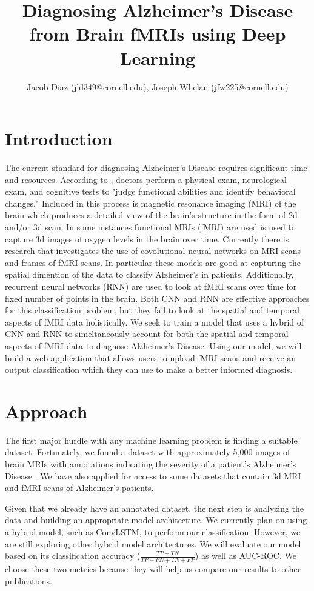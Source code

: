 \documentclass[10pt]{article}
\title{Diagnosing Alzheimer's Disease from Brain fMRIs using Deep Learning}
\author{Jacob Diaz (jld349@cornell.edu), Joseph Whelan (jfw225@cornell.edu)}
\begin{document}
 
	
	\maketitle
	
	\section{Introduction}
	The current standard for diagnosing Alzheimer's Disease requires significant time and resources. According to \cite[Mayo Clinic]{alz_desc}, doctors perform a physical exam, neurological exam, and cognitive tests to 
	"judge functional abilities and identify behavioral changes." Included in this process is magnetic resonance imaging (MRI) of the brain which produces a detailed view of the brain's structure in the form of 2d and/or 3d scan. In some instances functional MRIs (fMRI) are used is used to capture 3d images of oxygen levels in the brain over time. Currently there is research that investigates the use of covolutional neural networks on MRI scans and frames of fMRI scans. In particular these models are good at capturing the spatial dimention of the data to classify Alzheimer's in patients. Additionally, recurrent neural networks (RNN) are used to look at fMRI scans over time for fixed number of points in the brain. Both CNN and RNN are effective approaches for this classification problem, but they fail to look at the spatial and temporal aspects of fMRI data holistically. We seek to train a model that uses a hybrid of CNN and RNN to simeltaneously account for both the spatial and temporal aspects of fMRI data to diagnose Alzheimer's Disease. Using our model, we will build a web application that allows users to upload fMRI scans and receive an output classification which they can use to make a better informed diagnosis.
	

	\section{Approach}
	The first major hurdle with any machine learning problem is finding a suitable dataset. Fortunately, we found a dataset with approximately 5,000 images of brain MRIs with annotations indicating the severity of a patient's Alzheimer's Disease \citep{kaggle_dset}. We have also applied for access to some datasets that contain 3d MRI and fMRI scans of Alzheimer's patients. 

	Given that we already have an annotated dataset, the next step is analyzing the data and building an appropriate model architecture. We currently plan on using a hybrid model, such as ConvLSTM, to perform our classification. However, we are still exploring other hybrid model architectures. We will evaluate our model based on its classification accuracy
	($\frac{TP + TN}{TP + FN + TN + FP}$)
	as well as AUC-ROC. We choose these two metrics because they will help us  compare our results to other publications.	
\end{document}

